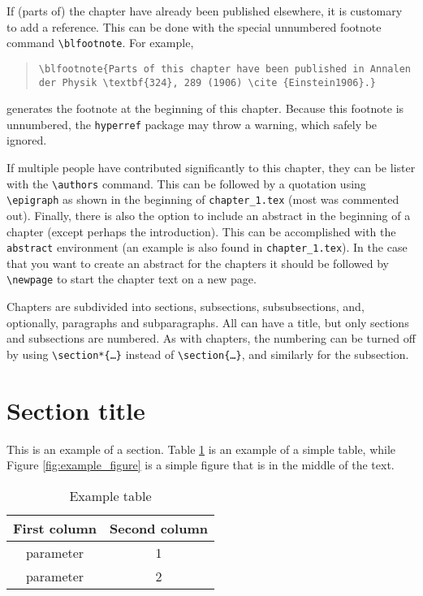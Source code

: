 If (parts of) the chapter have already been published elsewhere, it is customary to add a reference. This can be done with the special unnumbered footnote command \texttt{\textbackslash blfootnote}. For example,

\begin{quote}
	\texttt{\textbackslash blfootnote\{Parts of this chapter have been published in Annalen der Physik \textbackslash textbf\{324\}, 289 (1906) \textbackslash cite \{Einstein1906\}.\}}
\end{quote}
generates the footnote at the beginning of this chapter. Because this footnote is unnumbered, the \texttt{hyperref} package may throw a warning, which safely be ignored.

If multiple people have contributed significantly to this chapter, they can be lister with the \texttt{\textbackslash authors} command. This can be followed by a quotation using \texttt{\textbackslash epigraph} as shown in the beginning of \texttt{chapter\_1.tex} (most was commented out). Finally, there is also the option to include an abstract in the beginning of a chapter (except perhaps the introduction). This can be accomplished with the \texttt{abstract} environment (an example is also found in \texttt{chapter\_1.tex}). In the case that you want to create an abstract for the chapters it should be followed by \texttt{\textbackslash newpage} to start the chapter text on a new page.

Chapters are subdivided into sections, subsections, subsubsections, and, optionally, paragraphs and subparagraphs. All can have a title, but only sections and subsections are numbered. As with chapters, the numbering can be turned off by using \texttt{\textbackslash section*\{\ldots\}} instead of \texttt{\textbackslash section\{\ldots\}}, and similarly for the subsection.

\section{Section title}

This is an example of a section. Table \ref{tab:example} is an example of a simple table, while Figure \ref{fig:example_figure} is a simple figure that is in the middle of the text.

\begin{table}[h]
	\centering
	\caption{Example table}
	\label{tab:example}
	\begin{tabular}{cc}
		First column  & Second column    \\
		\hline
		parameter & 1 \\
		parameter & 2 \\
		\hline
	\end{tabular}
\end{table}

